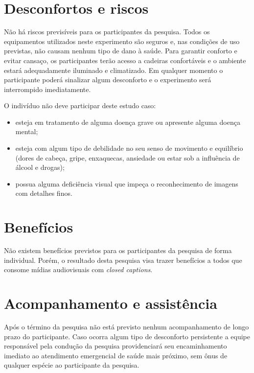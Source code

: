 \documentclass[a4paper,11pt,titlepage,singlespacing]{article}
\begin{document}
\section*{Desconfortos e riscos}

\noindent Não há riscos previsíveis para os participantes da pesquisa. Todos os equipamentos utilizados neste experimento são seguros e, nas condições de uso previstas, não causam nenhum tipo de dano à saúde. Para garantir conforto e evitar cansaço, os participantes terão acesso a cadeiras confortáveis e o ambiente estará adequadamente iluminado e climatizado. Em qualquer momento o participante poderá sinalizar algum desconforto e o experimento será interrompido imediatamente.

O indivíduo não deve participar deste estudo caso:

\begin{itemize}
\item esteja em tratamento de alguma doença grave ou apresente alguma doença mental;
\item esteja com algum tipo de debilidade no seu senso de movimento e equilíbrio (dores de cabeça, gripe, enxaquecas, ansiedade ou estar sob a influência de álcool e drogas);
\item possua alguma deficiência visual que impeça o reconhecimento de imagens com detalhes finos.
\end{itemize}

\section*{Benefícios}

\noindent Não existem benefícios previstos para os participantes da pesquisa de forma individual. Porém, o resultado desta pesquisa visa trazer benefícios a todos que consome mídias audiovisuais com \textit{closed captions}.

\section*{Acompanhamento e assistência}

\noindent Após o término da pesquisa não está previsto nenhum acompanhamento de longo prazo do participante. Caso ocorra algum tipo de desconforto persistente a equipe responsável pela condução da pesquisa providenciará seu encaminhamento imediato ao atendimento emergencial de saúde mais próximo, sem ônus de qualquer espécie ao participante da pesquisa.
\end{document}

